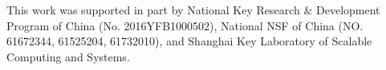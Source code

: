\section*{}
This work was supported in part by National Key Research \& Development Program
of China (No. 2016YFB1000502), National NSF of China (NO. 61672344, 61525204,
61732010), and Shanghai Key Laboratory of Scalable Computing and Systems.

